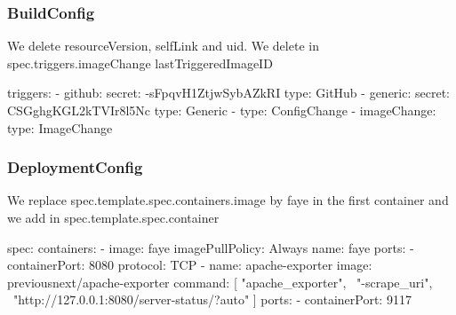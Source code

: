 \documentclass{beamer}
\begin{document}
\begin{frame}[fragile]
  \frametitle{BuildConfig}
  We delete resourceVersion, selfLink and uid. We delete in spec.triggers.imageChange lastTriggeredImageID
  \begin{yamlcode}
    triggers:                                                                                                       
    - github:                                                                                                       
        secret: -sFpqvH1ZtjwSybAZkRI                                                                                
      type: GitHub                                                                                                  
    - generic:                                                                                                      
      secret: CSGghgKGL2kTVIr8l5Nc                                                                                
      type: Generic                                                                                                 
    - type: ConfigChange                                                                                            
    - imageChange:                                                                                                  
      type: ImageChange
  \end{yamlcode}
\end{frame}

\begin{frame}[fragile]
  \frametitle{DeploymentConfig}
  We replace spec.template.spec.containers.image by faye in the first container and we add in spec.template.spec.container
  \begin{yamlcode}
    spec:
      containers:
      - image: faye                                                                                               
      imagePullPolicy: Always                                                                                   
      name: faye                                                                                            
      ports:                                                                                                
      - containerPort: 8080                                                                                     
      protocol: TCP 
      - name: apache-exporter
      image: previousnext/apache-exporter
      command: [ "apache_exporter", \
      "-scrape_uri", \
      "http://127.0.0.1:8080/server-status/?auto" ]
      ports:
      - containerPort: 9117
  \end{yamlcode}
\end{frame}
\end{document}
